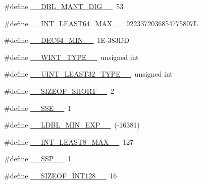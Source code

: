 \begin{DoxyCompactItemize}
\#define \hyperlink{build-analizer__host-_desktop___qt__5__9__0___g_c_c__64bit-debug_2moc__predefs_8h_ae8f0035094061d550323c738b8d67601}{\+\_\+\+\_\+\+D\+B\+L\+\_\+\+M\+A\+N\+T\+\_\+\+D\+I\+G\+\_\+\+\_\+}~53
\item 
\#define \hyperlink{build-analizer__host-_desktop___qt__5__9__0___g_c_c__64bit-debug_2moc__predefs_8h_ac8ff7f5492853e7e2fa19ebb2b98c9bc}{\+\_\+\+\_\+\+I\+N\+T\+\_\+\+L\+E\+A\+S\+T64\+\_\+\+M\+A\+X\+\_\+\+\_\+}~9223372036854775807\+L
\item 
\#define \hyperlink{build-analizer__host-_desktop___qt__5__9__0___g_c_c__64bit-debug_2moc__predefs_8h_abd66733cff0ce1656bb7e744aa151bea}{\+\_\+\+\_\+\+D\+E\+C64\+\_\+\+M\+I\+N\+\_\+\+\_\+}~1\+E-\/383\+D\+D
\item 
\#define \hyperlink{build-analizer__host-_desktop___qt__5__9__0___g_c_c__64bit-debug_2moc__predefs_8h_a1304d54dba90274495e0b09c9820927b}{\+\_\+\+\_\+\+W\+I\+N\+T\+\_\+\+T\+Y\+P\+E\+\_\+\+\_\+}~unsigned int
\item 
\#define \hyperlink{build-analizer__host-_desktop___qt__5__9__0___g_c_c__64bit-debug_2moc__predefs_8h_a76363f8817bf3df4542ebbcce172df53}{\+\_\+\+\_\+\+U\+I\+N\+T\+\_\+\+L\+E\+A\+S\+T32\+\_\+\+T\+Y\+P\+E\+\_\+\+\_\+}~unsigned int
\item 
\#define \hyperlink{build-analizer__host-_desktop___qt__5__9__0___g_c_c__64bit-debug_2moc__predefs_8h_ae9ea889821e3c2486a7435a83a309e80}{\+\_\+\+\_\+\+S\+I\+Z\+E\+O\+F\+\_\+\+S\+H\+O\+R\+T\+\_\+\+\_\+}~2
\item 
\#define \hyperlink{build-analizer__host-_desktop___qt__5__9__0___g_c_c__64bit-debug_2moc__predefs_8h_a7f85a85bc12e5cc7526909a91780f70a}{\+\_\+\+\_\+\+S\+S\+E\+\_\+\+\_\+}~1
\item 
\#define \hyperlink{build-analizer__host-_desktop___qt__5__9__0___g_c_c__64bit-debug_2moc__predefs_8h_ac3707c00cdbb574b68fd6263ac4d0407}{\+\_\+\+\_\+\+L\+D\+B\+L\+\_\+\+M\+I\+N\+\_\+\+E\+X\+P\+\_\+\+\_\+}~(-\/16381)
\item 
\#define \hyperlink{build-analizer__host-_desktop___qt__5__9__0___g_c_c__64bit-debug_2moc__predefs_8h_adc1ccadf1d98117e586324ccb189c09f}{\+\_\+\+\_\+\+I\+N\+T\+\_\+\+L\+E\+A\+S\+T8\+\_\+\+M\+A\+X\+\_\+\+\_\+}~127
\item 
\#define \hyperlink{build-analizer__host-_desktop___qt__5__9__0___g_c_c__64bit-debug_2moc__predefs_8h_a5bdc5761fa4dd6f2a284bd16f319009d}{\+\_\+\+\_\+\+S\+S\+P\+\_\+\+\_\+}~1
\item 
\#define \hyperlink{build-analizer__host-_desktop___qt__5__9__0___g_c_c__64bit-debug_2moc__predefs_8h_a1433791b35cde12c112c2ef54b61a4d2}{\+\_\+\+\_\+\+S\+I\+Z\+E\+O\+F\+\_\+\+I\+N\+T128\+\_\+\+\_\+}~16

\end{DoxyCompactItemize}
